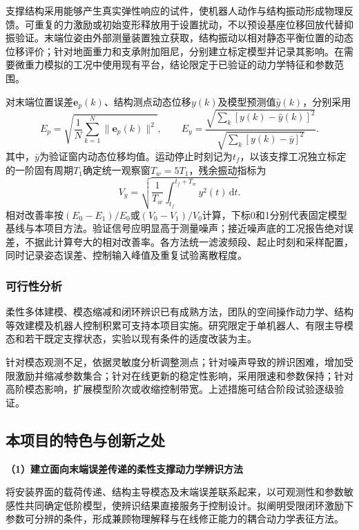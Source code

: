 \documentclass[UTF8,a4paper,zihao=-4,fontset=fandol]{ctexart}
\newcommand{\topic}[1]{\par\addvspace{0.5em}\noindent\textbf{#1}\par\nobreak}
\begin{document}
支撑结构采用能够产生真实弹性响应的试件，使机器人动作与结构振动形成物理反馈。可重复的力激励或初始变形释放用于设置扰动，不以预设基座位移回放代替抑振验证。末端位姿由外部测量装置独立获取，结构振动以相对静态平衡位置的动态位移评价；针对地面重力和支承附加阻尼，分别建立标定模型并记录其影响。在需要微重力模拟的工况中使用现有平台，结论限定于已验证的动力学特征和参数范围。

对末端位置误差$\bm e_p(k)$、结构测点动态位移$y(k)$及模型预测值$\hat y(k)$，分别采用
\begin{equation}
 E_p=\sqrt{\frac{1}{N}\sum_{k=1}^{N}\|\bm e_p(k)\|^2},\qquad
 E_y=\frac{\sqrt{\sum_k\left[y(k)-\hat y(k)\right]^2}}
 {\sqrt{\sum_k\left[y(k)-\bar y\right]^2}} .
 \label{eq:metrics}
\end{equation}
其中，$\bar y$为验证窗内动态位移均值。运动停止时刻记为$t_f$，以该支撑工况独立标定的一阶固有周期$T_1$确定统一观察窗$T_w=5T_1$，残余振动指标为
\begin{equation}
 V_y=\sqrt{\frac{1}{T_w}\int_{t_f}^{t_f+T_w} y^2(t)\,\mathrm dt} .
 \label{eq:vibration}
\end{equation}
相对改善率按$(E_0-E_1)/E_0$或$(V_0-V_1)/V_0$计算，下标0和1分别代表固定模型基线与本项目方法。验证信号应明显高于测量噪声；接近噪声底的工况报告绝对误差，不据此计算夸大的相对改善率。各方法统一滤波频段、起止时刻和采样配置，同时记录姿态误差、控制输入峰值及重复试验离散程度。

\subsubsection{可行性分析}

柔性多体建模、模态缩减和闭环辨识已有成熟方法，团队的空间操作动力学、结构等效建模及机器人控制积累可支持本项目实施。研究限定于单机器人、有限主导模态和若干既定支撑状态，实验以现有条件的适度改装为主。

针对模态观测不足，依据灵敏度分析调整测点；针对噪声导致的辨识困难，增加受限激励并缩减参数集合；针对在线更新的稳定性影响，采用限速和参数保持；针对高阶模态影响，扩展模型阶次或收缩控制带宽。上述措施可结合阶段试验逐级验证。

\subsection{本项目的特色与创新之处}

\topic{（1）建立面向末端误差传递的柔性支撑动力学辨识方法}

将安装界面的载荷传递、结构主导模态及末端误差联系起来，以可观测性和参数敏感性共同确定低阶模型，使辨识结果直接服务于控制设计。拟阐明受限闭环激励下参数可分辨的条件，形成兼顾物理解释与在线修正能力的耦合动力学表征方法。
\end{document}
